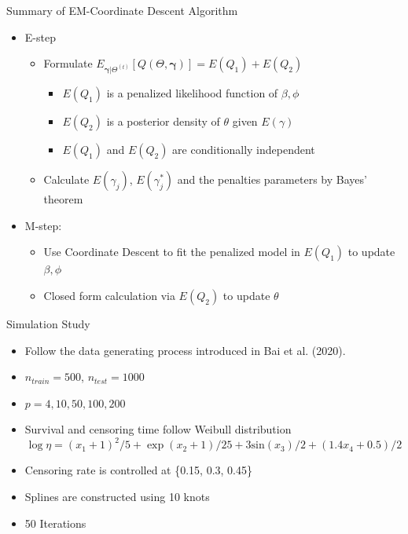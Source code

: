 \documentclass[
  ignorenonframetext,
  aspectratio=169]{beamer}
\providecommand{\tightlist}{%
  \setlength{\itemsep}{0pt}\setlength{\parskip}{0pt}}
\newcommand{\tp}{*}
\begin{document}
\begin{frame}{Summary of EM-Coordinate Descent Algorithm}
\protect\hypertarget{summary-of-em-coordinate-descent-algorithm-1}{}
\begin{itemize}
\tightlist
\item
  E-step

  \begin{itemize}
  \tightlist
  \item
    Formulate
    \(E_{\bm \gamma|\Theta^{(t)}}\left[Q(\Theta, \bm \gamma)\right] = E(Q_1) + E(Q_2)\)

    \begin{itemize}
    \tightlist
    \item
      \(E(Q_1)\) is a penalized likelihood function of \(\beta, \phi\)
    \item
      \(E(Q_2)\) is a posterior density of \(\theta\) given
      \(E(\gamma)\)
    \item
      \(E(Q_1)\) and \(E(Q_2)\) are conditionally independent
    \end{itemize}
  \item
    Calculate \(E(\gamma_{j})\), \(E(\gamma^\tp_{j})\) and the penalties
    parameters by Bayes' theorem
  \end{itemize}
\item
  M-step:

  \begin{itemize}
  \tightlist
  \item
    Use Coordinate Descent to fit the penalized model in \(E(Q_1)\) to
    update \(\beta, \phi\)
  \item
    Closed form calculation via \(E(Q_2)\) to update \(\theta\)
  \end{itemize}
\end{itemize}
\end{frame}

\begin{frame}{Simulation Study}
\protect\hypertarget{simulation-study-1}{}
\begin{itemize}
\item
  Follow the data generating process introduced in Bai et al. (2020).
\item
  \(n_{train} = 500\), \(n_{test}=1000\)
\item
  \(p=4, 10, 50, 100, 200\)
\item
  Survival and censoring time follow Weibull distribution \[
  \log \eta = (x_1 + 1)^2/5 + \exp (x_2 + 1)/25 + 3\text{sin} (x_3)/2 + (1.4x_4 + 0.5)/2
  \]
\item
  Censoring rate is controlled at \{0.15, 0.3, 0.45\}
\item
  Splines are constructed using 10 knots
\item
  50 Iterations
\end{itemize}
\end{frame}
\end{document}
